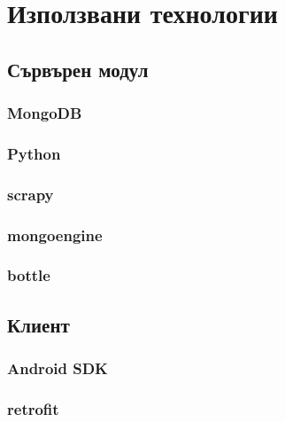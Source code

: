 \section{Използвани технологии}
	\subsection{Сървърен модул}
		\subsubsection{MongoDB}
		\subsubsection{Python}
		\subsubsection{scrapy}
		\subsubsection{mongoengine}
		\subsubsection{bottle}
	\subsection{Клиент}
		\subsubsection{Android SDK}
		\subsubsection{retrofit}